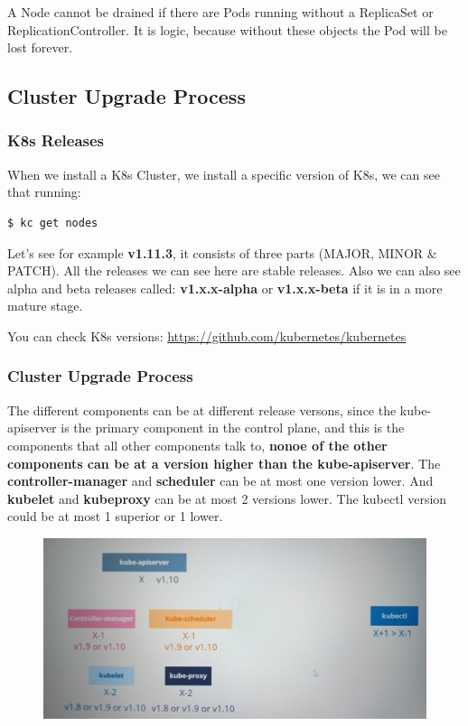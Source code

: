 \documentclass{article}
\newenvironment{blocktemplateIII}[1]{%
    \tcolorbox[beamer,%
    noparskip,breakable,
    ,colframe=Red,%
    colbacklower=LimeGreen!75!LightGreen,%
    title=#1]}%
    {\endtcolorbox}
\newenvironment{codetemplate}[1][]{%
  \mybasecolorbox[#1]
  \itshape
}{%
  \endmybasecolorbox
}
\begin{document}
\begin{blocktemplateIII}{WARNING}
A Node cannot be drained if there are Pods running without a ReplicaSet or ReplicationController. It is logic, because without these objects the Pod will be lost forever.
\end{blocktemplateIII}

\subsection{Cluster Upgrade Process}

\subsubsection{K8s Releases}
When we install a K8s Cluster, we install a specific version of K8s, we can see that running:

\begin{codetemplate}{}
\begin{verbatim}
$ kc get nodes
\end{verbatim}
\end{codetemplate}

Let's see for example \textbf{v1.11.3}, it consists of three parts (MAJOR, MINOR \& PATCH). All the releases we can see here are stable releases. Also we can also see alpha and beta releases called: \textbf{v1.x.x-alpha} or \textbf{v1.x.x-beta} if it is in a more mature stage.

You can check K8s versions: \href{https://github.com/kubernetes/kubernetes}{https://github.com/kubernetes/kubernetes}

\subsubsection{Cluster Upgrade Process}

The different components can be at different release versons, since the kube-apiserver is the primary component in the control plane, and this is the components that all other components talk to, \textbf{nonoe of the other components can be at a version higher than the kube-apiserver}. The \textbf{controller-manager} and \textbf{scheduler} can be at most one version lower. And \textbf{kubelet} and \textbf{kubeproxy} can be at most 2 versions lower. The kubectl version could be at most 1 superior or 1 lower.

\begin{figure}[H]
    \includegraphics[scale=0.5]{pictures/clusup.png}
\end{figure}
\end{document}
